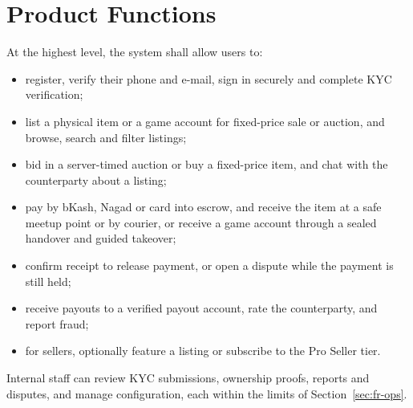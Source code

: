 \documentclass[11pt,a4paper]{report}
\begin{document}
\section{Product Functions}
At the highest level, the system shall allow users to:
\begin{itemize}[nosep]
    \item register, verify their phone and e-mail, sign in securely and complete KYC verification;
    \item list a physical item or a game account for fixed-price sale or auction, and browse, search and filter listings;
    \item bid in a server-timed auction or buy a fixed-price item, and chat with the counterparty about a listing;
    \item pay by bKash, Nagad or card into escrow, and receive the item at a safe meetup point or by courier, or receive a game account through a sealed handover and guided takeover;
    \item confirm receipt to release payment, or open a dispute while the payment is still held;
    \item receive payouts to a verified payout account, rate the counterparty, and report fraud;
    \item for sellers, optionally feature a listing or subscribe to the Pro Seller tier.
\end{itemize}
Internal staff can review KYC submissions, ownership proofs, reports and disputes, and manage configuration, each within the limits of Section~\ref{sec:fr-ops}.
\end{document}
